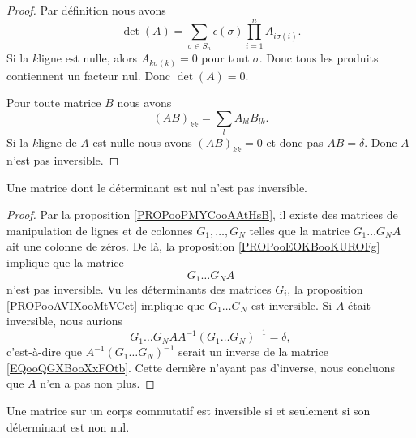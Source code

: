 \begin{proof}
    Par définition nous avons
    \begin{equation}
        \det(A)=\sum_{\sigma\in S_n}\epsilon(\sigma)\prod_{i=1}^nA_{i\sigma(i)}.
    \end{equation}
    Si la \( k\)\ieme ligne est nulle, alors \( A_{k\sigma(k)}=0\) pour tout \( \sigma\). Donc tous les produits contiennent un facteur nul. Donc \( \det(A)=0\).

    Pour toute matrice \( B\) nous avons
    \begin{equation}
        (AB)_{kk}=\sum_lA_{kl}B_{lk}.
    \end{equation}
    Si la \( k\)\ieme ligne de \( A\) est nulle nous avons \( (AB)_{kk}=0\) et donc pas \( AB=\delta\). Donc \( A\) n'est pas inversible.
\end{proof}

\begin{proposition}     \label{PROPooVUDJooLWjmSI}
    Une matrice dont le déterminant est nul n'est pas inversible.
\end{proposition}

\begin{proof}
    Par la proposition \ref{PROPooPMYCooAAtHsB}, il existe des matrices de manipulation de lignes et de colonnes \( G_1,\ldots, G_N\) telles que la matrice \( G_1\ldots G_NA\) ait une colonne de zéros. De là, la proposition \ref{PROPooEOKBooKUROFg} implique que la matrice
    \begin{equation}        \label{EQooQGXBooXxFOtb}
        G_1\ldots G_NA
    \end{equation}
    n'est pas inversible. Vu les déterminants des matrices \( G_i\),  la proposition \ref{PROPooAVIXooMtVCet} implique que \( G_1\ldots G_N\) est inversible. Si \( A\) était inversible, nous aurions
    \begin{equation}
        G_1\dots G_NAA^{-1}(G_1\ldots G_N)^{-1}=\delta,
    \end{equation}
    c'est-à-dire que \( A^{-1}(G_1\ldots G_N)^{-1}\) serait un inverse de la matrice \eqref{EQooQGXBooXxFOtb}. Cette dernière n'ayant pas d'inverse, nous concluons que \( A\) n'en a pas non plus.
\end{proof}

\begin{theorem}     \label{THOooSNXWooSRjleb}
    Une matrice sur un corps commutatif est inversible si et seulement si son déterminant est non nul.
\end{theorem}

